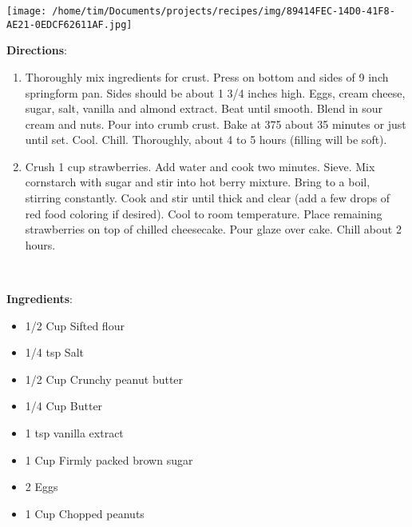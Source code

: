 \documentclass[11pt, twoside, openany]{book}
\begin{document}
\begin{minipage}[t]{0.2\linewidth}
\centering \strut\vspace*{-\baselineskip}\newline
\texttt{[image: /home/tim/Documents/projects/recipes/img/89414FEC-14D0-41F8-AE21-0EDCF62611AF.jpg]}\\
\end{minipage}\vspace{3mm}
\textbf{Directions}:
\vspace{-3mm}\begin{enumerate}\setlength\itemsep{-1mm}
\item Thoroughly mix ingredients for crust. Press on bottom and sides of 9 inch springform pan. Sides should be about 1 3/4 inches high. Eggs, cream cheese, sugar, salt, vanilla and almond extract. Beat until smooth. Blend in sour cream and nuts. Pour into crumb crust. Bake at 375 about 35 minutes or just until set. Cool. Chill. Thoroughly, about 4 to 5 hours (filling will be soft). 
\item Crush 1 cup strawberries. Add water and cook two minutes. Sieve. Mix cornstarch with sugar and stir into hot berry mixture. Bring to a boil, stirring constantly. Cook and stir until thick and clear (add a few drops of red food coloring if desired). Cool to room temperature. Place remaining strawberries on top of chilled cheesecake. Pour glaze over cake. Chill about 2 hours.
\end{enumerate}
 \label{peanut-butter-brownies}\hfill\textit{}\\
\begin{minipage}[t]{0.8\linewidth}
\textbf{Ingredients}:\vspace{-3mm}
\begin{multicols}{2}
\begin{itemize}\setlength\itemsep{-1mm}
\item 1/2 Cup Sifted flour
\item 1/4 tsp Salt
\item 1/2 Cup Crunchy peanut butter
\item 1/4 Cup Butter
\item 1 tsp vanilla extract
\item 1 Cup Firmly packed brown sugar
\item 2 Eggs
\item 1 Cup Chopped peanuts
\end{itemize}
\end{multicols}
\end{minipage}
\end{document}
